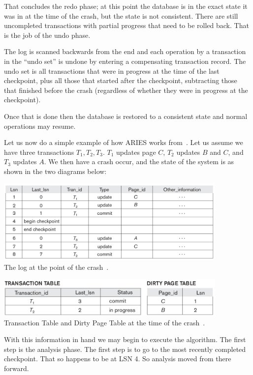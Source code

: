 That concludes the redo phase; at this point the database is in the exact state it was in at the time of the crash, but the state is not consistent. There are still uncompleted transactions with partial progress that need to be rolled back. That is the job of the undo phase.

The log is scanned backwards from the end and each operation by a transaction in the ``undo set'' is undone by entering a compensating transaction record. The undo set is all transactions that were in progress at the time of the last checkpoint, plus all those that started after the checkpoint, subtracting those that finished before the crash (regardless of whether they were in progress at the checkpoint). 

Once that is done then the database is restored to a consistent state and normal operations may resume. 

Let us now do a simple example of how ARIES works from~\cite{fds}. Let us assume we have three transactions $T_{1}, T_{2}, T_{3}$. $T_{1}$ updates page $C$, $T_{2}$ updates $B$ and $C$, and $T_{3}$ updates $A$. We then have a crash occur, and the state of the system is as shown in the two diagrams below:

\begin{center}
\includegraphics[width=0.85\textwidth]{images/aries-1}\\
The log at the point of the crash~\cite{fds}.
\end{center}

\begin{center}
\includegraphics[width=0.85\textwidth]{images/aries-2}\\
Transaction Table and Dirty Page Table at the time of the crash~\cite{fds}.
\end{center}

With this information in hand we may begin to execute the algorithm. The first step is the analysis phase. The first step is to go to the most recently completed checkpoint. That so happens to be at LSN 4. So analysis moved from there forward. 

